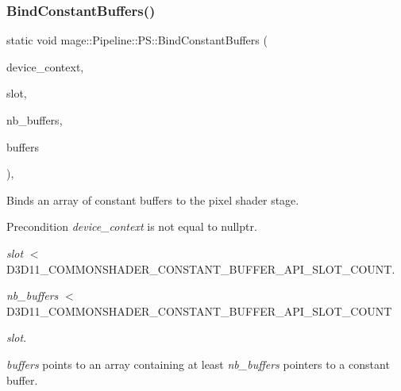 \subsubsection{\texorpdfstring{Bind\+Constant\+Buffers()}{BindConstantBuffers()}}
{\footnotesize\ttfamily static void mage\+::\+Pipeline\+::\+P\+S\+::\+Bind\+Constant\+Buffers (\begin{DoxyParamCaption}\item[{I\+D3\+D11\+Device\+Context2 $\ast$}]{device\+\_\+context,  }\item[{\hyperlink{namespacemage_af2b398bf98eb10351f49cad73fe2cc73}{u32}}]{slot,  }\item[{\hyperlink{namespacemage_af2b398bf98eb10351f49cad73fe2cc73}{u32}}]{nb\+\_\+buffers,  }\item[{I\+D3\+D11\+Buffer $\ast$const $\ast$}]{buffers }\end{DoxyParamCaption})\hspace{0.3cm}{\ttfamily [static]}, {\ttfamily [noexcept]}}

Binds an array of constant buffers to the pixel shader stage.

\begin{DoxyPrecond}{Precondition}
{\itshape device\+\_\+context} is not equal to {\ttfamily nullptr}. 

{\itshape slot} $<$ {\ttfamily D3\+D11\+\_\+\+C\+O\+M\+M\+O\+N\+S\+H\+A\+D\+E\+R\+\_\+\+C\+O\+N\+S\+T\+A\+N\+T\+\_\+\+B\+U\+F\+F\+E\+R\+\_\+\+A\+P\+I\+\_\+\+S\+L\+O\+T\+\_\+\+C\+O\+U\+NT}. 

{\itshape nb\+\_\+buffers} $<$ {\ttfamily D3\+D11\+\_\+\+C\+O\+M\+M\+O\+N\+S\+H\+A\+D\+E\+R\+\_\+\+C\+O\+N\+S\+T\+A\+N\+T\+\_\+\+B\+U\+F\+F\+E\+R\+\_\+\+A\+P\+I\+\_\+\+S\+L\+O\+T\+\_\+\+C\+O\+U\+NT} 
\begin{DoxyItemize}
\item {\itshape slot}. 
\end{DoxyItemize}

{\itshape buffers} points to an array containing at least {\itshape nb\+\_\+buffers} pointers to a constant buffer. 
\end{DoxyPrecond}

